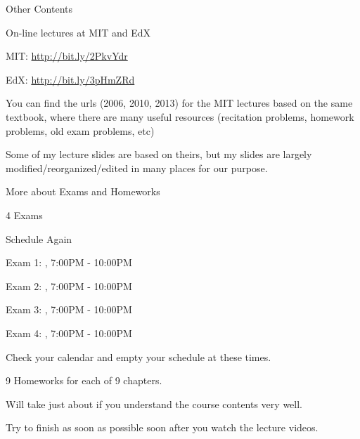 \begin{frame}{Other Contents}

\bci 

\item On-line lectures at MIT and EdX
\bci
\item MIT: \url{http://bit.ly/2PkvYdr}
\item EdX: \url{http://bit.ly/3pHmZRd}

\item You can find the urls (2006, 2010, 2013) for the MIT lectures
  based on the same textbook, where there are many useful resources
  (recitation problems, homework problems, old exam problems, etc)

\medskip
\item Some of my lecture slides are based on theirs, but my slides
   are largely  modified/reorganized/edited in many places for our
   purpose. 
\eci

\eci

\end{frame}





\begin{frame}{More about Exams and Homeworks}

\bci 

\item 4 Exams

\item Schedule Again

\bci
\item Exam 1: , 7:00PM - 10:00PM
\item Exam 2: , 7:00PM - 10:00PM
\item Exam 3: , 7:00PM - 10:00PM
\item Exam 4: , 7:00PM - 10:00PM
\item Check your calendar and empty your schedule at these times. 
  \eci

\item 9 Homeworks for each of 9 chapters. 
  \bci
  \item Will take just about  if you understand the course
    contents very well.

    \item Try to finish as soon as possible soon after you watch the lecture videos. 
  \eci

  \eci

\end{frame}


